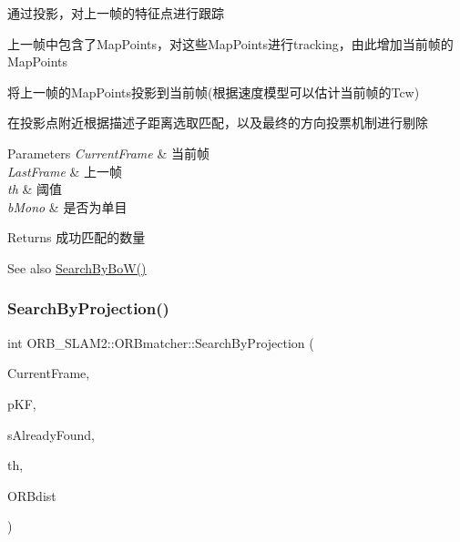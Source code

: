 通过投影，对上一帧的特征点进行跟踪 

上一帧中包含了\+Map\+Points，对这些\+Map\+Points进行tracking，由此增加当前帧的\+Map\+Points ~\newline

\begin{DoxyEnumerate}
\item 将上一帧的\+Map\+Points投影到当前帧(根据速度模型可以估计当前帧的\+Tcw)
\item 在投影点附近根据描述子距离选取匹配，以及最终的方向投票机制进行剔除 
\begin{DoxyParams}{Parameters}
{\em Current\+Frame} & 当前帧 \\
\hline
{\em Last\+Frame} & 上一帧 \\
\hline
{\em th} & 阈值 \\
\hline
{\em b\+Mono} & 是否为单目 \\
\hline
\end{DoxyParams}
\begin{DoxyReturn}{Returns}
成功匹配的数量 
\end{DoxyReturn}
\begin{DoxySeeAlso}{See also}
\mbox{\hyperlink{class_o_r_b___s_l_a_m2_1_1_o_r_bmatcher_a024fe40fa89785df914ef0a59cdf605d}{Search\+By\+Bo\+W()}} 
\end{DoxySeeAlso}

\end{DoxyEnumerate}\mbox{\label{class_o_r_b___s_l_a_m2_1_1_o_r_bmatcher_af83a014848a63b5a3b3086386f7a865e}} 
\subsubsection{\texorpdfstring{Search\+By\+Projection()}{SearchByProjection()}\hspace{0.1cm}{\footnotesize\ttfamily [3/4]}}
{\footnotesize\ttfamily int O\+R\+B\+\_\+\+S\+L\+A\+M2\+::\+O\+R\+Bmatcher\+::\+Search\+By\+Projection (\begin{DoxyParamCaption}\item[{\mbox{\hyperlink{class_o_r_b___s_l_a_m2_1_1_frame}{Frame}} \&}]{Current\+Frame,  }\item[{\mbox{\hyperlink{class_o_r_b___s_l_a_m2_1_1_key_frame}{Key\+Frame}} $\ast$}]{p\+KF,  }\item[{const std\+::set$<$ \mbox{\hyperlink{class_o_r_b___s_l_a_m2_1_1_map_point}{Map\+Point}} $\ast$$>$ \&}]{s\+Already\+Found,  }\item[{const float}]{th,  }\item[{const int}]{O\+R\+Bdist }\end{DoxyParamCaption})}

